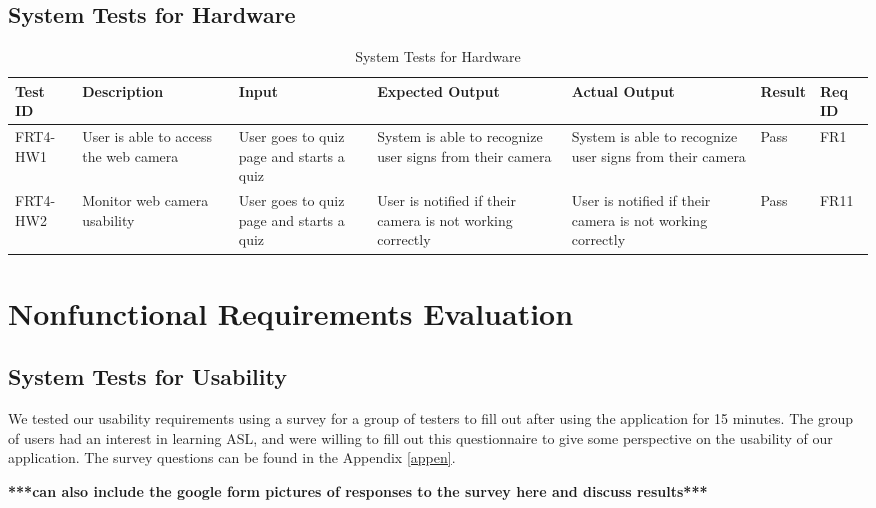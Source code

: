\documentclass[12pt, titlepage]{article}
\begin{document}
\subsection{System Tests for Hardware}
\begin{longtable}{|p{1cm}|p{2.5cm}|p{2cm}|p{2cm}|p{2cm}|p{1.5cm}|p{1cm}|}
\caption{System Tests for Hardware} \\
\hline
\textbf{Test ID} & \textbf{Description} & \textbf{Input} & \textbf{Expected Output} & \textbf{Actual Output} & \textbf{Result} & \textbf{Req ID}\\
\hline
FRT4-HW1 & User is able to access the web camera & User goes to quiz page and starts a quiz & System is able to recognize user signs from their camera & System is able to recognize user signs from their camera & Pass & FR1 \\
\hline
FRT4-HW2 & Monitor web camera usability & User goes to quiz page and starts a quiz & User is notified if their camera is not working correctly & User is notified if their camera is not working correctly & Pass & FR11 \\
\bottomrule
\end{longtable}

\newpage
\section{Nonfunctional Requirements Evaluation}

\subsection{System Tests for Usability}

We tested our usability requirements using a survey for a group of testers to fill out after using the application for 15 minutes. The group of users had an interest in learning ASL, and were willing to fill out this questionnaire to give some perspective on the usability of our application. The survey questions can be found in the Appendix \ref{appen}.

\textbf{***can also include the google form pictures of responses to the survey here and discuss results***}
\end{document}
